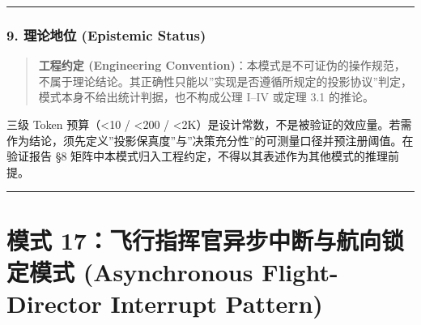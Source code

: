 \begin{Shaded}
\begin{Highlighting}[]
       \OperatorTok{:}
         \NormalTok{(\{}
\OperatorTok{:}\OperatorTok{,}
\OperatorTok{:}\OperatorTok{,}
\OperatorTok{:}
\NormalTok{        \}}\OperatorTok{,} \OperatorTok{,} \NormalTok{)}\OperatorTok{;}

       \OperatorTok{:}
        \OperatorTok{;}
\NormalTok{    \}}
\NormalTok{  \}}
\NormalTok{\}}
\end{Highlighting}
\end{Shaded}

\begin{center}\rule{0.5\linewidth}{0.5pt}\end{center}

\subsubsection{9. 理论地位 (Epistemic
Status)}\label{ux7406ux8bbaux5730ux4f4d-epistemic-status-1}

\begin{quote}
\textbf{工程约定 (Engineering
Convention)}：本模式是不可证伪的操作规范，不属于理论结论。其正确性只能以''实现是否遵循所规定的投影协议''判定，模式本身不给出统计判据，也不构成公理
I--IV 或定理 3.1 的推论。
\end{quote}

三级 Token 预算（\textless10 / \textless200 /
\textless2K）是设计常数，不是被验证的效应量。若需作为结论，须先定义''投影保真度''与''决策充分性''的可测量口径并预注册阈值。在验证报告
§8 矩阵中本模式归入工程约定，不得以其表述作为其他模式的推理前提。

\begin{center}\rule{0.5\linewidth}{0.5pt}\end{center}

\section{模式 17：飞行指挥官异步中断与航向锁定模式 (Asynchronous
Flight-Director Interrupt
Pattern)}\label{ux6a21ux5f0f-17ux98deux884cux6307ux6325ux5b98ux5f02ux6b65ux4e2dux65adux4e0eux822aux5411ux9501ux5b9aux6a21ux5f0f-asynchronous-flight-director-interrupt-pattern}

